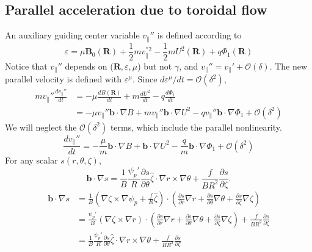 \documentclass[12pt]{article}
\begin{document}
\begin{CJK*}{UTF8}{gbsn}
\section{Parallel acceleration due to toroidal flow}
An auxiliary guiding center variable $v_{\parallel}{''}$ is defined according to 
\begin{equation}
    \varepsilon = \mu\mathbf{B_\mathrm{0}(R)} + \frac{1}{2}mv_{\parallel}^{''2} - \frac{1}{2}mU^2\mathbf{(R)} + q\Phi_1\mathbf{(R)}
\end{equation}
Notice that $v_{\parallel}{''}$ depends on ($\mathbf{R},\varepsilon,\mu$) but not $\gamma$, and $v_{\parallel}{''}=v_{\parallel}{'}+\mathcal{O}(\delta)$.
The new parallel velocity is defined with $\varepsilon^{\mu}$. Since $d\varepsilon^{\mu}/dt=\mathcal{O}(\delta^2)$,
\begin{equation}
\begin{split}
    mv_{\parallel}''\frac{dv_{\parallel}''}{dt} &= -\mu\frac{dB\mathbf{(R)}}{dt} + m\frac{dU^2}{dt} - q\frac{d\Phi_1}{dt}\\
    &=-\mu v_{\parallel}''\mathbf{b}\cdot\nabla B + mv_{\parallel}''\mathbf{b}\cdot\nabla U^2 - qv_{\parallel}''
    \mathbf{b}\cdot\nabla\Phi_1 + \mathcal{O}(\delta^2)
\end{split}
\end{equation}
We will neglect the $\mathcal{O}(\delta^2)$ terms, which include the parallel nonlinearity.
\begin{equation}
    \frac{dv_{\parallel}''}{dt} = -\frac{\mu}{m}\mathbf{b}\cdot\nabla B + \mathbf{b}\cdot\nabla U^2 - \frac{q}{m}\mathbf{b}\cdot\nabla\Phi_1 + \mathcal{O}(\delta^2)
\end{equation}
For any scalar $s(r,\theta,\zeta)$,
\begin{equation}
    \mathbf{b}\cdot\nabla s=\frac{1}{B}\frac{\psi_p'}{R}\frac{\partial s}{\partial \theta}\hat{\zeta}\cdot\nabla r \times \nabla\theta
    + \frac{f}{BR^2}\frac{\partial s}{\partial \zeta}.
\end{equation}
{\color{cyan}
\begin{equation*}
\begin{split}
    \mathbf{b}\cdot\nabla s&=\frac{1}{B}(\nabla\zeta\times\nabla\psi_p+\frac{f}{R}\hat{\zeta})\cdot(\frac{\partial s}{\partial r}\nabla r
    +\frac{\partial s}{\partial \theta}\nabla \theta+\frac{\partial s}{\partial \zeta}\nabla \zeta)\\
    &=\frac{\psi_p'}{B}(\nabla\zeta\times\nabla r)\cdot(\frac{\partial s}{\partial r}\nabla r
    +\frac{\partial s}{\partial \theta}\nabla \theta+\frac{\partial s}{\partial \zeta}\nabla \zeta)+\frac{f}{BR^2}\frac{\partial s}{\partial\zeta}\\
    &=\frac{1}{B}\frac{\psi_p'}{R}\frac{\partial s}{\partial \theta}\hat{\zeta}\cdot\nabla r \times \nabla\theta
    + \frac{f}{BR^2}\frac{\partial s}{\partial \zeta}
\end{split}
\end{equation*}
}


\end{CJK*}
\end{document}
